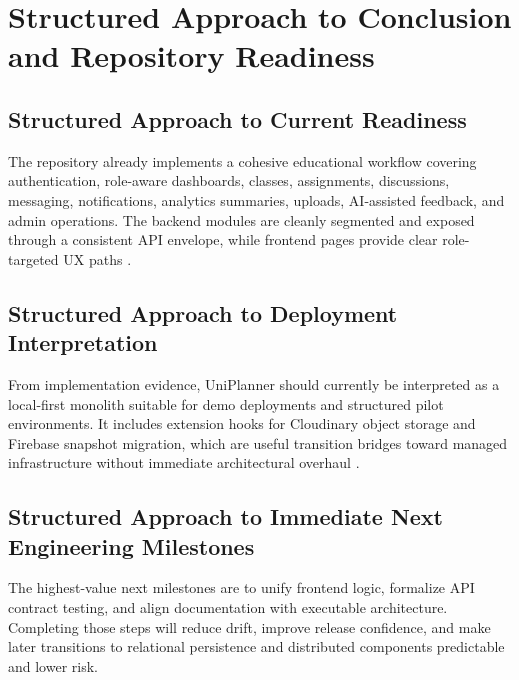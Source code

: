 \section{Structured Approach to Conclusion and Repository Readiness}

\subsection{Structured Approach to Current Readiness}

The repository already implements a cohesive educational workflow covering authentication, role-aware dashboards, classes, assignments, discussions, messaging, notifications, analytics summaries, uploads, AI-assisted feedback, and admin operations. The backend modules are cleanly segmented and exposed through a consistent API envelope, while frontend pages provide clear role-targeted UX paths \cite{repo-server-modules,repo-public-ui}.

\subsection{Structured Approach to Deployment Interpretation}

From implementation evidence, UniPlanner should currently be interpreted as a local-first monolith suitable for demo deployments and structured pilot environments. It includes extension hooks for Cloudinary object storage and Firebase snapshot migration, which are useful transition bridges toward managed infrastructure without immediate architectural overhaul \cite{repo-upload,firebase-admin-docs}.

\subsection{Structured Approach to Immediate Next Engineering Milestones}

The highest-value next milestones are to unify frontend logic, formalize API contract testing, and align documentation with executable architecture. Completing those steps will reduce drift, improve release confidence, and make later transitions to relational persistence and distributed components predictable and lower risk.

